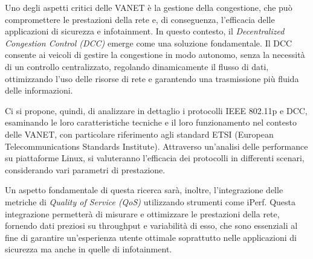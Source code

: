 Uno degli aspetti critici delle VANET è la gestione della congestione, che può compromettere le prestazioni della rete e, di conseguenza, l'efficacia delle applicazioni di sicurezza e infotainment. In questo contesto, il \textit{Decentralized Congestion Control (DCC)} emerge come una soluzione fondamentale. Il DCC consente ai veicoli di gestire la congestione in modo autonomo, senza la necessità di un controllo centralizzato, regolando dinamicamente il flusso di dati, ottimizzando l'uso delle risorse di rete e garantendo una trasmissione più fluida delle informazioni.

Ci si propone, quindi, di analizzare in dettaglio i protocolli IEEE 802.11p e DCC, esaminando le loro caratteristiche tecniche e il loro funzionamento nel contesto delle VANET, con particolare riferimento agli standard ETSI (European Telecommunications Standards Institute). Attraverso un'analisi delle performance su piattaforme Linux, si valuteranno l'efficacia dei protocolli in differenti scenari, considerando vari parametri di prestazione.

Un aspetto fondamentale di questa ricerca sarà, inoltre, l'integrazione delle metriche di \textit{Quality of Service (QoS)} utilizzando strumenti come iPerf. Questa integrazione permetterà di misurare e ottimizzare le prestazioni della rete, fornendo dati preziosi su throughput e variabilità di esso, che sono essenziali al fine di garantire un'esperienza utente ottimale soprattutto nelle applicazioni di sicurezza ma anche in quelle di infotainment.